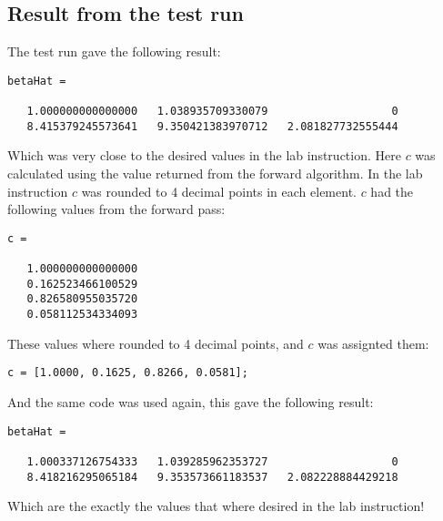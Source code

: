 \documentclass[]{article}
\begin{document}
\hypertarget{result-from-the-test-run}{%
\subsection{Result from the test run}\label{result-from-the-test-run}}

The test run gave the following result:

\begin{verbatim}
betaHat =

   1.000000000000000   1.038935709330079                   0
   8.415379245573641   9.350421383970712   2.081827732555444
\end{verbatim}

Which was very close to the desired values in the lab instruction. Here
\(c\) was calculated using the value returned from the forward
algorithm. In the lab instruction \(c\) was rounded to 4 decimal points
in each element. \(c\) had the following values from the forward pass:

\begin{verbatim}
c =

   1.000000000000000
   0.162523466100529
   0.826580955035720
   0.058112534334093
\end{verbatim}

These values where rounded to 4 decimal points, and \(c\) was assignted
them:

\begin{verbatim}
c = [1.0000, 0.1625, 0.8266, 0.0581];
\end{verbatim}

And the same code was used again, this gave the following result:

\begin{verbatim}
betaHat =

   1.000337126754333   1.039285962353727                   0
   8.418216295065184   9.353573661183537   2.082228884429218
\end{verbatim}

Which are the exactly the values that where desired in the lab
instruction!
\end{document}
